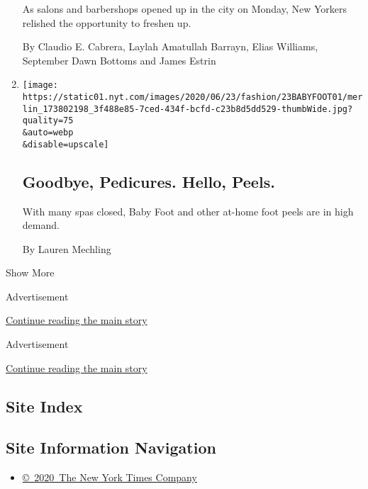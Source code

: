 \begin{enumerate}
  As salons and barbershops opened up in the city on Monday, New Yorkers
  relished the opportunity to freshen up.

  By Claudio E. Cabrera, Laylah Amatullah Barrayn, Elias Williams,
  September Dawn Bottoms and James Estrin
\item
  \href{/2020/06/23/style/self-care/babyfoot-foot-peels.html}{}

  \texttt{[image: https://static01.nyt.com/images/2020/06/23/fashion/23BABYFOOT01/merlin\_173802198\_3f488e85-7ced-434f-bcfd-c23b8d5dd529-thumbWide.jpg?quality=75\\\&auto=webp\\\&disable=upscale]}

  \hypertarget{goodbye-pedicures-hello-peels}{%
  \subsection{Goodbye, Pedicures. Hello,
  Peels.}\label{goodbye-pedicures-hello-peels}}

  With many spas closed, Baby Foot and other at-home foot peels are in
  high demand.

  By Lauren Mechling
\end{enumerate}

Show More

Advertisement

\protect\hyperlink{after-mid8}{Continue reading the main story}

Advertisement

\protect\hyperlink{after-mktg}{Continue reading the main story}

\hypertarget{site-index}{%
\subsection{Site Index}\label{site-index}}

\hypertarget{site-information-navigation}{%
\subsection{Site Information
Navigation}\label{site-information-navigation}}

\begin{itemize}
\tightlist
\item
  \href{https://help.nytimes.com/hc/en-us/articles/115014792127-Copyright-notice}{©~2020~The
  New York Times Company}
\end{itemize}

